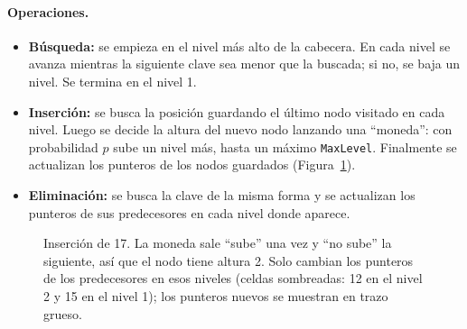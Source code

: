 \documentclass[11pt,a4paper]{article}
\begin{document}
\paragraph{Operaciones.}
\begin{itemize}
  \item \textbf{Búsqueda:} se empieza en el nivel más alto de la cabecera. En
  cada nivel se avanza mientras la siguiente clave sea menor que la buscada; si
  no, se baja un nivel. Se termina en el nivel 1.
  \item \textbf{Inserción:} se busca la posición guardando el último nodo
  visitado en cada nivel. Luego se decide la altura del nuevo nodo lanzando una
  ``moneda'': con probabilidad $p$ sube un nivel más, hasta un máximo
  \texttt{MaxLevel}. Finalmente se actualizan los punteros de los nodos
  guardados (Figura~\ref{fig:insert}).
  \item \textbf{Eliminación:} se busca la clave de la misma forma y se
  actualizan los punteros de sus predecesores en cada nivel donde aparece.
\end{itemize}

\begin{figure}[!htb]
\centering
{}
\caption{Inserción de 17. La moneda sale ``sube'' una vez y ``no sube'' la
siguiente, así que el nodo tiene altura 2. Solo cambian los punteros de los
predecesores en esos niveles (celdas sombreadas: 12 en el nivel 2 y 15 en el
nivel 1); los punteros nuevos se muestran en trazo grueso.}
\label{fig:insert}
\end{figure}
\end{document}

